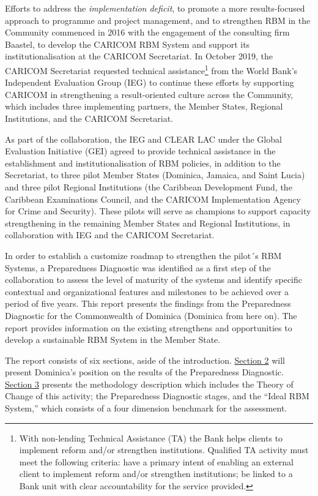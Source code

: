 \documentclass[
]{book}
\begin{document}
Efforts to address the \emph{implementation deficit}, to promote a more results-focused approach to programme and project management, and to strengthen RBM in the Community commenced in 2016 with the engagement of the consulting firm Baastel, to develop the CARICOM RBM System and support its institutionalisation at the CARICOM Secretariat. In October 2019, the CARICOM Secretariat requested technical assistance\footnote{With non-lending Technical Assistance (TA) the Bank helps clients to implement reform and/or strengthen institutions. Qualified TA activity must meet the following criteria: have a primary intent of enabling an external client to implement reform and/or strengthen institutions; be linked to a Bank unit with clear accountability for the service provided.} from the World Bank's Independent Evaluation Group (IEG) to continue these efforts by supporting CARICOM in strengthening a result-oriented culture across the Community, which includes three implementing partners, the Member States, Regional Institutions, and the CARICOM Secretariat.

As part of the collaboration, the IEG and CLEAR LAC under the Global Evaluation Initiative (GEI) agreed to provide technical assistance in the establishment and institutionalisation of RBM policies, in addition to the Secretariat, to three pilot Member States (Dominica, Jamaica, and Saint Lucia) and three pilot Regional Institutions (the Caribbean Development Fund, the Caribbean Examinations Council, and the CARICOM Implementation Agency for Crime and Security). These pilots will serve as champions to support capacity strengthening in the remaining Member States and Regional Institutions, in collaboration with IEG and the CARICOM Secretariat.

In order to establish a customize roadmap to strengthen the pilot´s RBM Systems, a Preparedness Diagnostic was identified as a first step of the collaboration to assess the level of maturity of the systems and identify specific contextual and organizational features and milestones to be achieved over a period of five years.
This report presents the findings from the Preparedness Diagnostic for the Commonwealth of Dominica (Dominica from here on). The report provides information on the existing strengthens and opportunities to develop a sustainable RBM System in the Member State.

The report consists of six sections, aside of the introduction. \protect\hyperlink{section2}{Section 2} will present Dominica's position on the results of the Preparedness Diagnostic. \protect\hyperlink{section3}{Section 3} presents the methodology description which includes the Theory of Change of this activity; the Preparedness Diagnostic stages, and the ``Ideal RBM System,'' which consists of a four dimension benchmark for the assessment.
\end{document}
